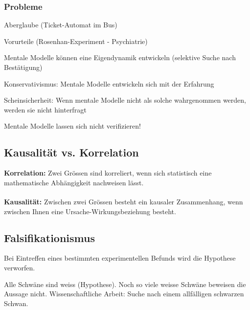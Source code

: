 \subsubsection{Probleme}
\begin{compactenum}
	\item Aberglaube (Ticket-Automat im Bus)
	\item Vorurteile (Rosenhan-Experiment - Psychiatrie)
	\item Mentale Modelle können eine Eigendynamik entwickeln (selektive Suche nach Bestätigung)
	\item Konservativismus: Mentale Modelle entwickeln sich mit der	Erfahrung
	\item Scheinsicherheit: Wenn mentale Modelle nicht als solche wahrgenommen werden, werden sie nicht hinterfragt
\end{compactenum}
Mentale Modelle lassen sich nicht verifizieren!

\subsection{Kausalität vs. Korrelation}
\begin{multicols}{2}
	\textbf{Korrelation:}
	Zwei Grössen sind korreliert, wenn sich statistisch eine mathematische Abhängigkeit nachweisen lässt.
	\ \\ \\
	\textbf{Kausalität:}
	Zwischen zwei Grössen besteht ein kausaler Zusammenhang, wenn zwischen Ihnen eine Ursache-Wirkungsbeziehung besteht.
\end{multicols}

\subsection{Falsifikationismus}
Bei Eintreffen eines bestimmten experimentellen Befunds wird die Hypothese verworfen.
\begin{example}
	Alle Schwäne sind weiss (Hypothese). Noch so viele weisse Schwäne beweisen die Aussage nicht. Wissenschaftliche Arbeit: Suche nach einem allfälligen schwarzen Schwan.
\end{example}